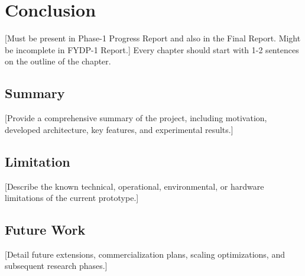 \chapter{Conclusion}

[Must be present in Phase-1 Progress Report and also in the Final Report. Might be incomplete in FYDP-1 Report.] Every chapter should start with 1-2 sentences on the outline of the chapter.

\section{Summary}
[Provide a comprehensive summary of the project, including motivation, developed architecture, key features, and experimental results.]

\section{Limitation}
[Describe the known technical, operational, environmental, or hardware limitations of the current prototype.]

\section{Future Work}
[Detail future extensions, commercialization plans, scaling optimizations, and subsequent research phases.]
